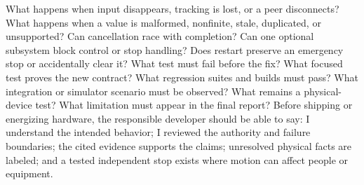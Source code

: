 \markdownRendererInterblockSeparator
{}\markdownRendererUlBegin
\markdownRendererUlItem What happens when input disappears, tracking is lost, or a peer disconnects?\markdownRendererUlItemEnd 
\markdownRendererUlItem What happens when a value is malformed, nonfinite, stale, duplicated, or unsupported?\markdownRendererUlItemEnd 
\markdownRendererUlItem Can cancellation race with completion?\markdownRendererUlItemEnd 
\markdownRendererUlItem Can one optional subsystem block control or stop handling?\markdownRendererUlItemEnd 
\markdownRendererUlItem Does restart preserve an emergency stop or accidentally clear it?\markdownRendererUlItemEnd 
\markdownRendererUlEnd \markdownRendererInterblockSeparator
{}
\markdownRendererSectionEnd \markdownRendererSectionBegin
{}\markdownRendererInterblockSeparator
{}\markdownRendererUlBegin
\markdownRendererUlItem What test must fail before the fix?\markdownRendererUlItemEnd 
\markdownRendererUlItem What focused test proves the new contract?\markdownRendererUlItemEnd 
\markdownRendererUlItem What regression suites and builds must pass?\markdownRendererUlItemEnd 
\markdownRendererUlItem What integration or simulator scenario must be observed?\markdownRendererUlItemEnd 
\markdownRendererUlItem What remains a physical-device test?\markdownRendererUlItemEnd 
\markdownRendererUlItem What limitation must appear in the final report?\markdownRendererUlItemEnd 
\markdownRendererUlEnd \markdownRendererInterblockSeparator
{}
\markdownRendererSectionEnd \markdownRendererSectionBegin
{}\markdownRendererInterblockSeparator
{}\markdownRendererInterblockSeparator
{}
\markdownRendererSectionEnd \markdownRendererSectionBegin
{}\markdownRendererInterblockSeparator
{}Before shipping or energizing hardware, the responsible developer should be\markdownRendererSoftLineBreak
{}able to say: I understand the intended behavior; I reviewed the authority and\markdownRendererSoftLineBreak
{}failure boundaries; the cited evidence supports the claims; unresolved\markdownRendererSoftLineBreak
{}physical facts are labeled; and a tested independent stop exists where motion\markdownRendererSoftLineBreak
{}can affect people or equipment.\markdownRendererInterblockSeparator
{}\markdownRendererThematicBreak{}\markdownRendererInterblockSeparator
